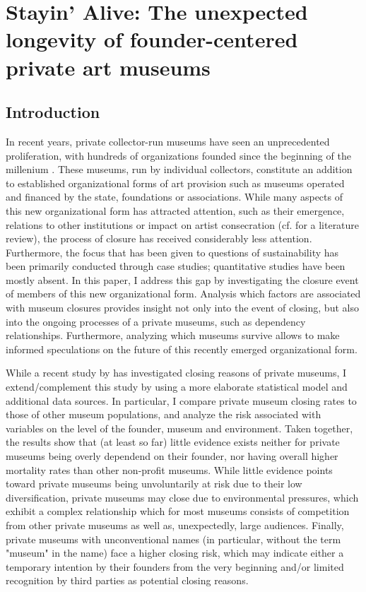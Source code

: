 \documentclass[12pt]{article}
\author{Johannes }
\date{\today}
\title{}
\begin{document}
\section*{Stayin' Alive: The unexpected longevity of founder-centered private art museums}

\subsection*{Introduction}


In recent years, private collector-run museums have seen an unprecedented proliferation, with hundreds of organizations founded since the beginning of the millenium \parencite{Velthuis_etal_2023_boom,LarrysList_2015_report}.
These museums, run by individual collectors, constitute an addition to established organizational forms of art provision such as museums operated and financed by the state, foundations or associations.
While many aspects of this new organizational form has attracted attention, such as their emergence, relations to other institutions or impact on artist consecration (cf. \cite{Kolbe_etal_2022_privatemuseum} for a literature review), the process of closure has received considerably less attention. 
Furthermore, the focus that has been given to questions of sustainability has been primarily conducted through case studies; quantitative studies have been mostly absent.
In this paper, I address this gap by investigating the closure event of members of this new organizational form.
Analysis which factors are associated with museum closures provides insight not only into the event of closing, but also into the ongoing processes of a private museums, such as dependency relationships.
Furthermore, analyzing which museums survive allows to make informed speculations on the future of this recently emerged organizational form.


While a recent study by \textcite{Velthuis_Gera_2024_fragility} has investigated closing reasons of private museums, I extend/complement this study by using a more elaborate statistical model and additional data sources.
In particular, I compare private museum closing rates to those of other museum populations, and analyze the risk associated with variables on the level of the founder, museum and environment. 
Taken together, the results show that (at least so far) little evidence exists neither for private museums being overly dependend on their founder, nor having overall higher mortality rates than other non-profit museums.
While little evidence points toward private museums being unvoluntarily at risk due to their low diversification, private museums may close due to environmental pressures, which exhibit a complex relationship which for most museums consists of competition from other private museums as well as, unexpectedly, large audiences.
Finally, private museums with unconventional names (in particular, without the term "museum" in the name) face a higher closing risk, which may indicate either a temporary intention by their founders from the very beginning and/or limited recognition by third parties as potential closing reasons.
\end{document}
